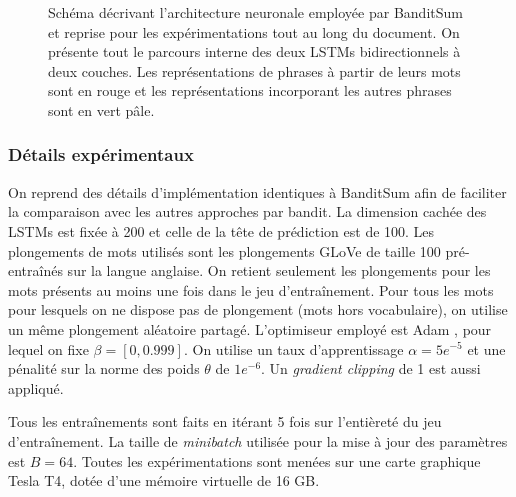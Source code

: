 \begin{figure}[ht!]
    \caption[Architecture neuronale de BanditSum]
    {Schéma décrivant l'architecture neuronale employée par BanditSum et reprise pour 
    les expérimentations tout au long du document.
    On présente tout le parcours interne des deux LSTMs bidirectionnels à deux 
    couches.
    Les représentations de phrases à partir de leurs mots sont en rouge et les 
    représentations incorporant les autres phrases sont en vert pâle.}
    \label{fig:archi}
\end{figure}

\subsubsection*{Détails expérimentaux}

On reprend des détails d'implémentation 
identiques à BanditSum afin de faciliter 
la comparaison avec les autres approches par bandit.
La dimension cachée des LSTMs est fixée à 200
et celle de la tête de prédiction est de 100.
Les plongements de mots utilisés sont les plongements GLoVe \citep{pennington2014glove} de taille 100 
pré-entraînés sur la langue anglaise.
On retient seulement les plongements pour les mots présents au moins une fois 
dans le jeu d'entraînement.
Pour tous les mots pour lesquels on ne dispose pas de plongement 
(mots hors vocabulaire), on utilise un même plongement 
aléatoire partagé.
L'optimiseur employé est Adam \citep{kingma2014method}, pour lequel on fixe 
$\beta = [0, 0.999]$.
On utilise un taux d'apprentissage $\alpha=5e^{-5}$ et une pénalité sur la norme 
des poids $\theta$ de $1e^{-6}$.
Un \textit{gradient clipping} de 1 est aussi appliqué.

Tous les entraînements sont faits en itérant 
5 fois sur l'entièreté du jeu d'entraînement.
La taille de \textit{minibatch} utilisée pour la mise à jour 
des paramètres est $B=64$.
Toutes les expérimentations sont menées 
sur une carte graphique Tesla T4, dotée d'une mémoire 
virtuelle de 16 GB.

